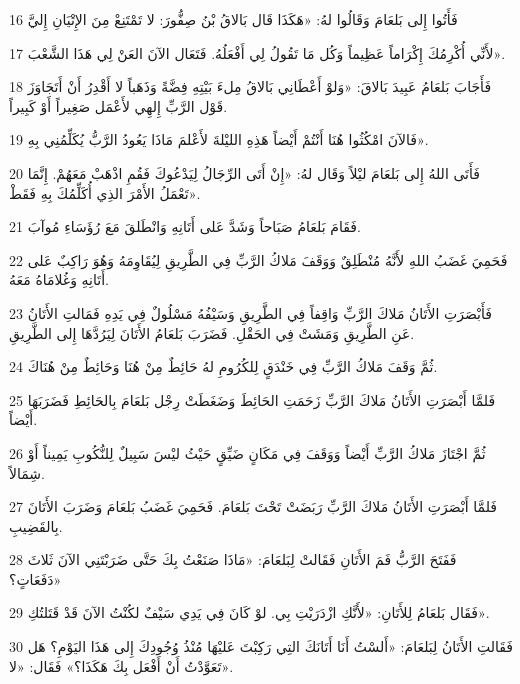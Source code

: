 \par 16 فَأَتُوا إِلى بَلعَامَ وَقَالُوا لهُ: «هَكَذَا قَال بَالاقُ بْنُ صِفُّورَ: لا تَمْتَنِعْ مِنَ الإِتْيَانِ إِليَّ
\par 17 لأَنِّي أُكْرِمُكَ إِكْرَاماً عَظِيماً وَكُل مَا تَقُولُ لِي أَفْعَلُهُ. فَتَعَال الآنَ العَنْ لِي هَذَا الشَّعْبَ».
\par 18 فَأَجَابَ بَلعَامُ عَبِيدَ بَالاقَ: «وَلوْ أَعْطَانِي بَالاقُ مِلءَ بَيْتِهِ فِضَّةً وَذَهَباً لا أَقْدِرُ أَنْ أَتَجَاوَزَ قَوْل الرَّبِّ إِلهِي لأَعْمَل صَغِيراً أَوْ كَبِيراً.
\par 19 فَالآنَ امْكُثُوا هُنَا أَنْتُمْ أَيْضاً هَذِهِ الليْلةَ لأَعْلمَ مَاذَا يَعُودُ الرَّبُّ يُكَلِّمُنِي بِهِ».
\par 20 فَأَتَى اللهُ إِلى بَلعَامَ ليْلاً وَقَال لهُ: «إِنْ أَتَى الرِّجَالُ لِيَدْعُوكَ فَقُمِ اذْهَبْ مَعَهُمْ. إِنَّمَا تَعْمَلُ الأَمْرَ الذِي أُكَلِّمُكَ بِهِ فَقَطْ».
\par 21 فَقَامَ بَلعَامُ صَبَاحاً وَشَدَّ عَلى أَتَانِهِ وَانْطَلقَ مَعَ رُؤَسَاءِ مُوآبَ.
\par 22 فَحَمِيَ غَضَبُ اللهِ لأَنَّهُ مُنْطَلِقٌ وَوَقَفَ مَلاكُ الرَّبِّ فِي الطَّرِيقِ لِيُقَاوِمَهُ وَهُوَ رَاكِبٌ عَلى أَتَانِهِ وَغُلامَاهُ مَعَهُ.
\par 23 فَأَبْصَرَتِ الأَتَانُ مَلاكَ الرَّبِّ وَاقِفاً فِي الطَّرِيقِ وَسَيْفُهُ مَسْلُولٌ فِي يَدِهِ فَمَالتِ الأَتَانُ عَنِ الطَّرِيقِ وَمَشَتْ فِي الحَقْلِ. فَضَرَبَ بَلعَامُ الأَتَانَ لِيَرُدَّهَا إِلى الطَّرِيقِ.
\par 24 ثُمَّ وَقَفَ مَلاكُ الرَّبِّ فِي خَنْدَقٍ لِلكُرُومِ لهُ حَائِطٌ مِنْ هُنَا وَحَائِطٌ مِنْ هُنَاكَ.
\par 25 فَلمَّا أَبْصَرَتِ الأَتَانُ مَلاكَ الرَّبِّ زَحَمَتِ الحَائِطَ وَضَغَطَتْ رِجْل بَلعَامَ بِالحَائِطِ فَضَرَبَهَا أَيْضاً.
\par 26 ثُمَّ اجْتَازَ مَلاكُ الرَّبِّ أَيْضاً وَوَقَفَ فِي مَكَانٍ ضَيِّقٍ حَيْثُ ليْسَ سَبِيلٌ لِلنُّكُوبِ يَمِيناً أَوْ شِمَالاً.
\par 27 فَلمَّا أَبْصَرَتِ الأَتَانُ مَلاكَ الرَّبِّ رَبَضَتْ تَحْتَ بَلعَامَ. فَحَمِيَ غَضَبُ بَلعَامَ وَضَرَبَ الأَتَانَ بِالقَضِيبِ.
\par 28 فَفَتَحَ الرَّبُّ فَمَ الأَتَانِ فَقَالتْ لِبَلعَامَ: «مَاذَا صَنَعْتُ بِكَ حَتَّى ضَرَبْتَنِي الآنَ ثَلاثَ دَفَعَاتٍ؟»
\par 29 فَقَال بَلعَامُ لِلأَتَانِ: «لأَنَّكِ ازْدَرَيْتِ بِي. لوْ كَانَ فِي يَدِي سَيْفٌ لكُنْتُ الآنَ قَدْ قَتَلتُكِ».
\par 30 فَقَالتِ الأَتَانُ لِبَلعَامَ: «أَلسْتُ أَنَا أَتَانَكَ التِي رَكِبْتَ عَليْهَا مُنْذُ وُجُودِكَ إِلى هَذَا اليَوْمِ؟ هَل تَعَوَّدْتُ أَنْ أَفْعَل بِكَ هَكَذَا؟» فَقَال: «لا».
